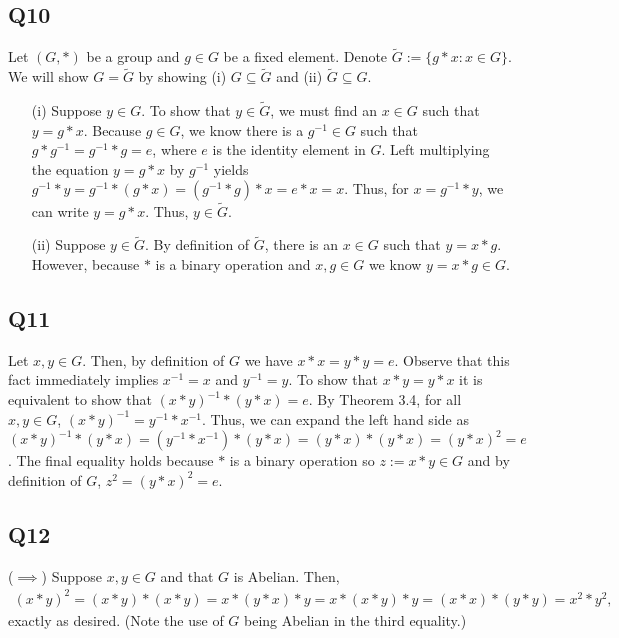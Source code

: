 \documentclass[12pt]{article}
\numberwithin{theorem}{section}
\numberwithin{equation}{section}
\numberwithin{remark}{section}
\numberwithin{definition}{section}
\numberwithin{theorem}{section}
\numberwithin{lemma}{section}
\numberwithin{example}{section}
\begin{document}
\subsection{Q10}

Let $(G,*)$ be a group and $g\in G$ be a fixed element. Denote $\widetilde{G}:=\{g*x:x\in G\}$. We will show $G=\widetilde{G}$ by showing (i) $G\subseteq\widetilde{G}$ and  (ii) $\widetilde{G}\subseteq G$. 
\begin{itemize}
	\item[(i)]{Suppose $y\in G$. To show that $y\in\widetilde{G}$, we must find an $x\in G$ such that $y=g*x$. Because $g\in G$, we know there is a $g^{-1}\in G$ such that $g*g^{-1}=g^{-1}*g=e$, where $e$ is the identity element in $G$. Left multiplying the equation $y=g*x$ by $g^{-1}$ yields $g^{-1}*y=g^{-1}*(g*x)=(g^{-1}*g)*x=e*x=x$. Thus, for $x=g^{-1}*y$, we can write $y=g*x$. Thus, $y\in\widetilde{G}$.}
	\item[(ii)]{Suppose $y\in\widetilde{G}$. By definition of $\widetilde{G}$, there is an $x\in G$ such that $y=x*g$. However, because $*$ is a binary operation and $x,g\in G$ we know $y=x*g\in G$.}
\end{itemize}



\subsection{Q11}

Let $x,y\in G$. Then, by definition of $G$ we have $x*x=y*y=e$. Observe that this fact immediately implies $x^{-1}=x$ and $y^{-1}=y$. To show that $x*y=y*x$ it is equivalent to show that $(x*y)^{-1}*(y*x)=e$. By Theorem 3.4, for all $x,y\in G$, $(x*y)^{-1}=y^{-1}*x^{-1}$. Thus, we can expand the left hand side as $(x*y)^{-1}*(y*x)=(y^{-1}*x^{-1})*(y*x)=(y*x)*(y*x)=(y*x)^2=e$. The final equality holds because $*$ is a binary operation so $z:=x*y\in G$ and by definition of $G$, $z^2=(y*x)^2=e$.



\subsection{Q12}

($\implies$) Suppose $x,y\in G$ and that $G$ is Abelian. Then,
\begin{align*}
	(x*y)^2=(x*y)*(x*y)=x*(y*x)*y=x*(x*y)*y=(x*x)*(y*y)=x^2*y^2,
\end{align*}
exactly as desired. (Note the use of $G$ being Abelian in the third equality.)
\end{document}
